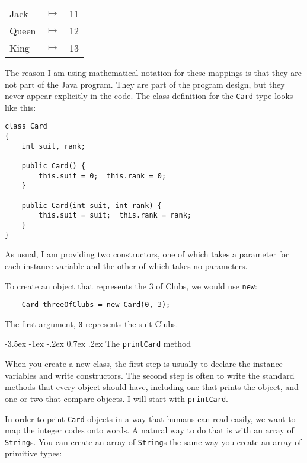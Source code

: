 \documentclass{book}
\makeatletter
\renewcommand{\section}{\@startsection 
    {section} {1} {0mm}%
    {-3.5ex \@plus -1ex \@minus -.2ex}%
    {0.7ex \@plus.2ex}%
    {\normalfont\Large\bfseries}}
\makeatother
\begin{document}
\begin{tabular}{l c l}
Jack & $\mapsto$ & 11 \\
Queen & $\mapsto$ & 12 \\
King & $\mapsto$ & 13 \\
\end{tabular}

The reason I am using mathematical notation for these mappings is
that they are not part of the Java program.  They are part of the
program design, but they never appear explicitly in the code.
The class definition for the {\tt Card} type looks like this:

\begin{verbatim}
class Card
{
    int suit, rank;

    public Card() { 
        this.suit = 0;  this.rank = 0;
    }

    public Card(int suit, int rank) { 
        this.suit = suit;  this.rank = rank;
    }
}
\end{verbatim}

As usual, I am providing two constructors, one of which takes
a parameter for each instance variable and the other of which
takes no parameters.


To create an object that represents the 3 of Clubs, we would
use {\tt new}:

\begin{verbatim}
    Card threeOfClubs = new Card(0, 3);
\end{verbatim}
%
The first argument, {\tt 0} represents the suit Clubs.

\section{The {\tt printCard} method}
\label{printcard}

When you create a new class, the first step is usually to declare the
instance variables and write constructors.  The second step is often
to write the standard methods that every object should have, including
one that prints the object, and one or two that compare objects.  I
will start with {\tt printCard}.


In order to print {\tt Card} objects in a way that humans
can read easily, we want to map the integer codes onto words.
A natural way to do that is with an array of {\tt String}s.  You
can create an array of {\tt String}s the same way you create an
array of primitive types:
\end{document}
